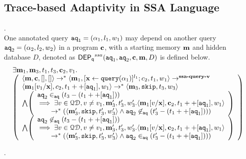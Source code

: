 {\subsection{Trace-based Adaptivity in SSA Language}
%
\begin{defn}
.
\\
{
One annotated query $\mathtt{aq}_1 = ({\alpha}_1, l_1, w_1)$ may depend on another query $\mathtt{aq}_2 = ({\alpha}_2,l_2, w_2)$ in a program ${\boldsymbol{\mathbf{c}}}$,
with a starting memory ${\boldsymbol{\mathbf{m}}}$ and  hidden database $D$, denoted as 
%
$\mathsf{DEP_{q}}^{ssa}(\mathtt{aq}_1, \mathtt{aq}_2, {\boldsymbol{\mathbf{c}}}, {\boldsymbol{\mathbf{m}}}, D)$ is defined below. 
%
%
\[
\begin{array}{l}
\exists \ssa{m}_1,\ssa{m}_3,t_1,t_3,\ssa{c}_2,v_1.\\
  \left (\begin{array}{l}   
\config{\ssa{m}, \ssa{c}, [], []} \rightarrow^{*} 
\config{\ssa{m}_1, [\assign{\ssa{x}}{\query({\qval}_1)}]^{l_1} ; c_2,
  t_1, w_1} 
\rightarrow^{\textbf{{ssa-query-v}}} 
\\ 
\config{\ssa{m}_1[v_1/\ssa{x}], c_2, t_1 ++ [\aq_1], w_1} 
\rightarrow^{*} \config{\ssa{m}_3, \eskip, t_3,w_3}
 \\ \bigwedge
  \left( 
  \begin{array}{l}
  \aq_2 \aqin (t_3 - (t_1 ++ [\aq_1])) 
  \\
  \implies 
  \exists v \in \qdom, v \neq v_1, \ssa{m}_3', t_3', w_3'.  
  \config{\ssa{m}_1[v/\ssa{x}], {\ssa{c}_2}, t_1 ++ [\aq_1], w_1} 
  \\ 
  \quad \quad 
  \rightarrow^{*}
  (\config{\ssa{m}_3', \eskip, t_3', w_3'} 
  \land 
  \aq_2 \not \aqin (t_3'-(t_1 ++ [\aq_1])))
\end{array} \right )
\\\bigwedge
\left( 
  \begin{array}{l}
  	\aq_2 \not\aqin (t_3 - (t_1 ++ [\aq_1]))
  	\\
  	\implies 
	\exists v \in \qdom, v \neq v_1, \ssa{m}_3', t_3', w_3'. 
	\config{\ssa{m}_1[v/\ssa{x}], {\ssa{c}_2}, t_1 ++ [\aq_1], w_1}
	\\ 
	\quad \quad 
	\rightarrow^{*} 
	(\config{\ssa{m}_3', \eskip, t_3', w_3'} 
	\land 
	\aq_2  \aqin (t_3' - (t_1 ++ [\aq_1])))
\end{array} \right )
\end{array} \right )
\end{array}
\]
}
\end{defn}
%
%
\begin{defn}
.

\end{defn}}
